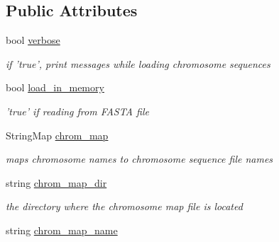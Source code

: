 \subsection*{Public Attributes}
\begin{DoxyCompactItemize}
\item 
\hypertarget{classChromosomes_a954bae240564f6f589a30d253291eb75}{
bool \hyperlink{classChromosomes_a954bae240564f6f589a30d253291eb75}{verbose}}
\label{classChromosomes_a954bae240564f6f589a30d253291eb75}

\begin{DoxyCompactList}\small\item\em if 'true', print messages while loading chromosome sequences \end{DoxyCompactList}\item 
\hypertarget{classChromosomes_a408a06b9ae635ceaf0b75452bcb62763}{
bool \hyperlink{classChromosomes_a408a06b9ae635ceaf0b75452bcb62763}{load\_\-in\_\-memory}}
\label{classChromosomes_a408a06b9ae635ceaf0b75452bcb62763}

\begin{DoxyCompactList}\small\item\em 'true' if reading from FASTA file \end{DoxyCompactList}\item 
\hypertarget{classChromosomes_ad72dcc9b9d3b0b041b737d895a20eef6}{
StringMap \hyperlink{classChromosomes_ad72dcc9b9d3b0b041b737d895a20eef6}{chrom\_\-map}}
\label{classChromosomes_ad72dcc9b9d3b0b041b737d895a20eef6}

\begin{DoxyCompactList}\small\item\em maps chromosome names to chromosome sequence file names \end{DoxyCompactList}\item 
\hypertarget{classChromosomes_a5fb6a314ac56a7ace50070fd3e5ae708}{
string \hyperlink{classChromosomes_a5fb6a314ac56a7ace50070fd3e5ae708}{chrom\_\-map\_\-dir}}
\label{classChromosomes_a5fb6a314ac56a7ace50070fd3e5ae708}

\begin{DoxyCompactList}\small\item\em the directory where the chromosome map file is located \end{DoxyCompactList}\item 
\hypertarget{classChromosomes_a71b69dff9fc8c4cae1671df17e11a016}{
string \hyperlink{classChromosomes_a71b69dff9fc8c4cae1671df17e11a016}{chrom\_\-map\_\-name}}
\label{classChromosomes_a71b69dff9fc8c4cae1671df17e11a016}


\end{DoxyCompactItemize}
